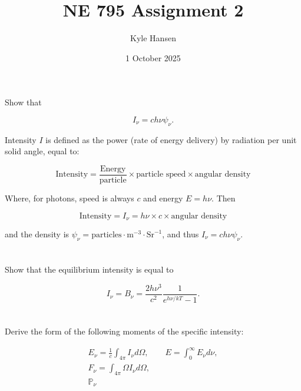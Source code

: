 \documentclass{template}
\title{NE 795 Assignment 2}
\author{Kyle Hansen}
\date{1 October 2025}
\begin{document}
\maketitle

\section{} Show that 

\[
    I_\nu = ch\nu\psi_\nu.
\]

Intensity $I$ is defined as the power (rate of energy delivery) by radiation per unit solid angle, equal to:

\begin{equation}
        \text{Intensity} = \frac{\text{Energy}}{\text{particle}}\times\text{particle speed}\times\text{angular density}
\end{equation}

Where, for photons, speed is always $c$ and energy $E=h\nu$. Then

\begin{equation}
        \text{Intensity} = I_\nu = h\nu \times c\times\text{angular density}
\end{equation}

and the density is $\psi_\nu = \text{particles}\cdot\text{m}^{-3}\cdot \text{Sr}^{-1}$, and thus $I_\nu = ch\nu\psi_\nu$.



\section{}

Show that the equilibrium intensity is equal to

\[
I_\nu = B_\nu = \frac{2h\nu^3}{c^2}\frac{1}{e^{h\nu/kT}-1}.
\]



\section{} Derive the form of the following moments of the specific intensity:

\begin{gather*}
    E_\nu = \frac{1}{c} \int_{4\pi} I_\nu d\Omega, \qquad E = \int_0^\infty E_{\nu} d \nu,\\
    F_\nu = \int_{4\pi} \Omega I_\nu d\Omega,\\
    \mathbb{P}_\nu
\end{gather*}
\end{document}
